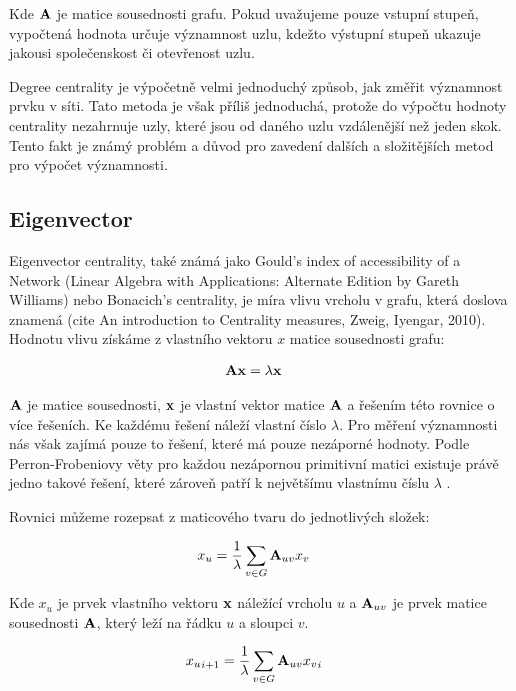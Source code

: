 \documentclass[12pt,titlepage]{report}
\begin{document}
Kde ${\bf A}$ je matice sousednosti grafu. Pokud uvažujeme pouze vstupní
stupeň, vypočtená hodnota určuje významnost uzlu, kdežto výstupní stupeň
ukazuje jakousi společenskost či otevřenost uzlu. 

Degree centrality je výpočetně velmi jednoduchý způsob, jak změřit významnost
prvku v síti. Tato metoda je však příliš jednoduchá, protože do výpočtu hodnoty
centrality nezahrnuje uzly, které jsou od daného uzlu vzdálenější než jeden
skok. Tento fakt je známý problém a důvod pro zavedení dalších a složitějších
metod pro výpočet významnosti.



\subsection{Eigenvector}
Eigenvector centrality, také známá jako Gould's index of accessibility of a
Network (Linear Algebra with Applications: Alternate Edition by Gareth
Williams) nebo Bonacich's centrality, je míra vlivu vrcholu v grafu, která
doslova znamená  (cite An introduction to Centrality measures, Zweig, Iyengar, 2010). Hodnotu vlivu získáme z
vlastního vektoru $x$ matice sousednosti grafu:

\begin{align}
{\bf Ax} &= \lambda {\bf x}
\end{align}

${\bf A}$ je matice sousednosti, ${\bf x}$ je vlastní vektor
matice ${\bf A}$ a řešením této rovnice o více řešeních. Ke každému řešení
náleží vlastní číslo $\lambda$. Pro měření významnosti nás však zajímá pouze to
řešení, které má pouze nezáporné hodnoty. Podle Perron-Frobeniovy věty pro
každou nezápornou primitivní matici existuje právě jedno takové řešení, které
zároveň patří k největšímu vlastnímu číslu $\lambda$ \cite{langvillemeyer}.

Rovnici můžeme rozepsat z maticového tvaru do jednotlivých složek:

\begin{align} 
x_u &=  \frac{1}{\lambda} \displaystyle\sum_{v \in G} {\bf A}_{uv} x_v 
\end{align} 

Kde $x_u$ je prvek vlastního vektoru ${\bf x}$
náležící vrcholu $u$ a ${\bf A}_{uv}$ je prvek matice sousednosti ${\bf A}$,
který leží na řádku $u$ a sloupci $v$.

\begin{align} 
{x_u}_{i + 1} &=  \frac{1}{\lambda} \displaystyle\sum_{v \in G} {\bf A}_{uv}
{x_v}_{i}
\end{align} 
\end{document}
